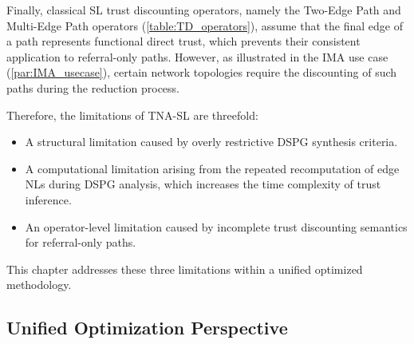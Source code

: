 Finally, classical \ac{SL} trust discounting operators, namely the Two-Edge Path and Multi-Edge Path operators (\cref{table:TD_operators}), assume that the final edge of a path represents functional direct trust, which prevents their consistent application to referral-only paths. However, as illustrated in the \ac{IMA} use case (\cref{par:IMA_usecase}), certain network topologies require the discounting of such paths during the reduction process.

Therefore, the limitations of \ac{TNA-SL} are threefold:
\begin{itemize}
    \item A structural limitation caused by overly restrictive \ac{DSPG} synthesis criteria.
    \item A computational limitation arising from the repeated recomputation of edge \acp{NL} during \ac{DSPG} analysis, which increases the time complexity of trust inference.
    \item An operator-level limitation caused by incomplete trust discounting semantics for referral-only paths.
\end{itemize}
This chapter addresses these three limitations within a unified optimized methodology.

\subsection*{Unified Optimization Perspective}

